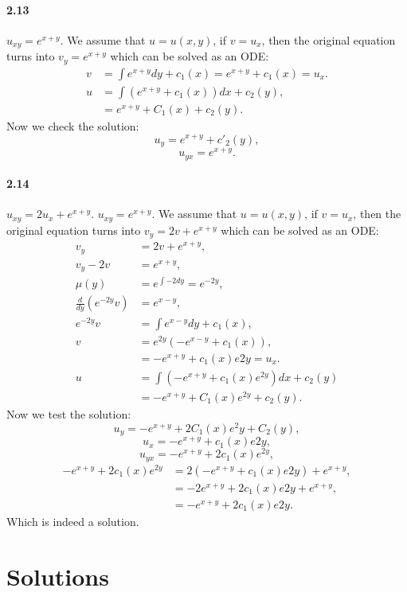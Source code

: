 \documentclass{article}
\begin{document}
\paragraph{2.13} $u_{xy}=e^{x+y}$. We assume that $u = u(x,y)$, if $v = u_x$, then the original equation turns into $v_y = e^{x+y}$ which can be solved as an ODE:
\begin{align*}
v &= \int e^{x+y} dy + c_1(x) = e^{x+y} + c_1(x) = u_x. \\[12pt]
u &= \int (e^{x+y} + c_1(x)) dx + c_2(y),\\
  &= e^{x+y} + C_1(x) + c_2(y).
\end{align*}
Now we check the solution:
$$u_y = e^{x+y} + c'_2(y),$$
$$u_{yx} = e^{x+y}.$$
\paragraph{2.14} $u_{xy}= 2u_x+e^{x+y}$. $u_{xy}=e^{x+y}$. We assume that $u = u(x,y)$, if $v = u_x$, then the original equation turns into $v_y = 2v + e^{x+y}$ which can be solved as an ODE:
\begin{align*}
	v_y &= 2v + e^{x+y},\\
	v_y - 2v &= e^{x + y},\\[6pt]
	\mu(y) &= e^{\int -2 dy} = e^{-2y},\\[6pt]
	\frac{d}{dy}\left(e^{-2y}v\right) &= e^{x-y},\\
	e^{-2y}v &= \int e^{x-y} dy + c_1(x),\\
	v &= e^{2y}\left(-e^{x-y} + c_1(x)\right),\\
	  &= -e^{x+y} + c_1(x)e{2y} = u_x.\\[12pt]
	u &= \int (-e^{x+y} + c_1(x)e^{2y}) dx + c_2(y)\\
	  &= -e^{x+y} + C_1(x)e^{2y} + c_2(y).
\end{align*}
Now we test the solution:
$$u_y = -e^{x+y} + 2C_1(x)e^2y + C_2(y),$$
$$u_x = -e^{x+y} + c_1(x)e{2y},$$
$$u_{yx} = -e^{x+y} + 2c_1(x)e^{2y},$$
\begin{align*}
-e^{x+y} + 2c_1(x)e^{2y} &= 2(-e^{x+y} + c_1(x)e{2y}) + e^{x+y},\\
                         &= -2e^{x+y} + 2c_1(x)e{2y} + e^{x+y},\\
                         &= -e^{x+y} + 2c_1(x)e{2y}.
\end{align*}
Which is indeed a solution.
\section{Solutions}
\end{document}
